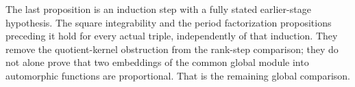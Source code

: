 The last proposition is an induction step with a fully stated
earlier-stage hypothesis. The square integrability and the
period factorization propositions preceding it hold for every
actual triple, independently of that induction. They remove
the quotient-kernel obstruction from the rank-step comparison;
they do not alone prove that two embeddings of the common
global module into automorphic functions are proportional.
That is the remaining global comparison.
